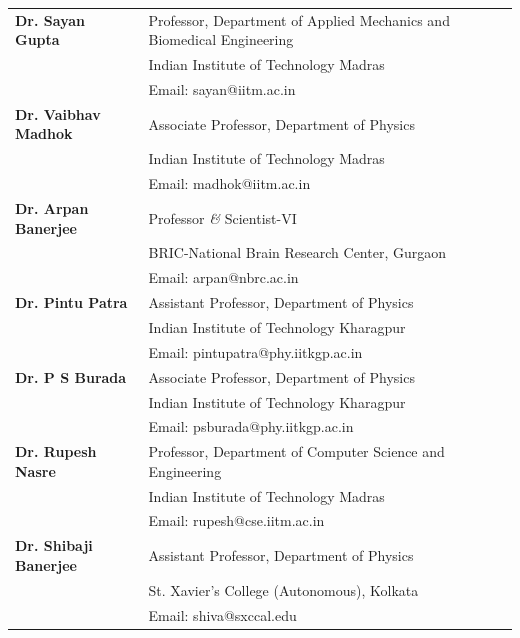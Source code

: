 \newpage


\noindent

\begin{longtable}[l]{@{} m{3.75cm} m{13.5cm}}

\textbf{Dr. Sayan Gupta} & Professor, Department of Applied Mechanics and Biomedical Engineering\\
& Indian Institute of Technology Madras\\
& Email: \textcolor{linkblue}{sayan@iitm.ac.in}\\[0.2cm]

\textbf{Dr. Vaibhav Madhok} & Associate Professor, Department of Physics\\
& Indian Institute of Technology Madras\\
& Email: \textcolor{linkblue}{madhok@iitm.ac.in}\\[0.2cm]

\textbf{Dr. Arpan Banerjee} & Professor \textit{\&} Scientist-VI\\
& BRIC-National Brain Research Center, Gurgaon\\
& Email: \textcolor{linkblue}{arpan@nbrc.ac.in}\\[0.2cm]

\textbf{Dr. Pintu Patra} & Assistant Professor, Department of Physics\\
& Indian Institute of Technology Kharagpur\\
& Email: \textcolor{linkblue}{pintupatra@phy.iitkgp.ac.in}\\[0.2cm]

\textbf{Dr. P S Burada} & Associate Professor, Department of Physics\\
& Indian Institute of Technology Kharagpur\\
& Email: \textcolor{linkblue}{psburada@phy.iitkgp.ac.in}\\[0.2cm]

\textbf{Dr. Rupesh Nasre} & Professor, Department of Computer Science and Engineering \\
& Indian Institute of Technology Madras\\
& Email: \textcolor{linkblue}{rupesh@cse.iitm.ac.in}\\[0.2cm]

\textbf{Dr. Shibaji Banerjee} & Assistant Professor, Department of Physics\\
& St. Xavier's College (Autonomous), Kolkata\\
& Email: \textcolor{linkblue}{shiva@sxccal.edu}\\[0.2cm]


\end{longtable}
